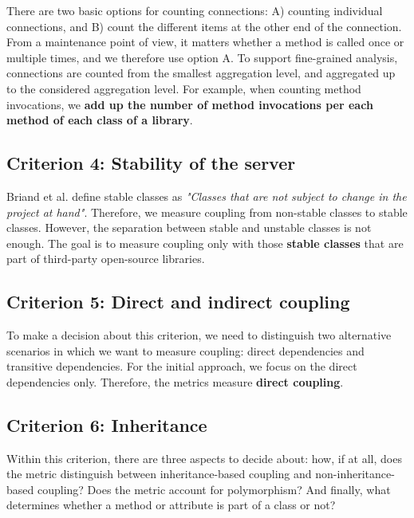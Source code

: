 \documentclass[a4paper]{article}
\begin{document}
There are two basic options for counting connections: A) counting individual connections, and B) count the different items at the other end of the connection. From a maintenance point of view, it matters whether a method is called once or multiple times, and we therefore use option A.
To support fine-grained analysis, connections are counted from the smallest aggregation level, and aggregated up to the considered aggregation level.
For example, when counting method invocations, we  \textbf{add up the number of method invocations per each method of each class of a library}.

\subsection{Criterion 4: Stability of the server}
Briand et al. \cite{briand1999unified} define stable classes as \textit{"Classes that are not subject to change in the project at hand"}. Therefore, we measure coupling from non-stable classes to stable classes.
However, the separation between stable and unstable classes is not enough. The goal is to measure coupling only with those \textbf{stable classes} that are part of third-party open-source libraries.

\subsection{Criterion 5: Direct and indirect coupling}
To make a decision about this criterion, we need to distinguish two alternative scenarios in which we want to measure coupling: direct dependencies and transitive dependencies. For the initial approach, we  focus on the direct dependencies only. Therefore, the metrics measure \textbf{direct coupling}.

\subsection{Criterion 6: Inheritance}
Within this criterion, there are three aspects to decide about: how, if at all, does the metric distinguish between inheritance-based coupling and non-inheritance-based coupling? Does the metric account for polymorphism? And finally, what determines whether a method or attribute is part of a class or not?
\end{document}

